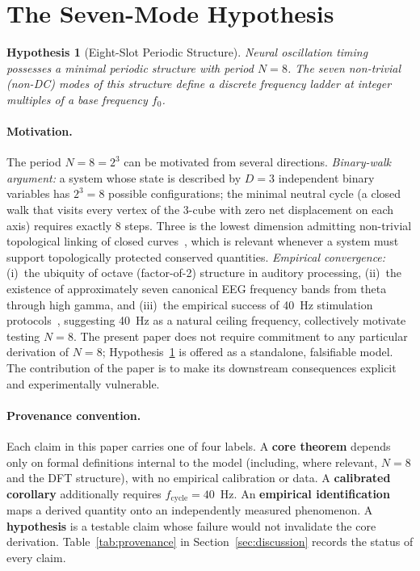 \documentclass[11pt,a4paper]{article}
\newtheorem{hypothesis}{Hypothesis}
\begin{document}
\section{The Seven-Mode Hypothesis}
\label{sec:hypothesis}

\begin{hypothesis}[Eight-Slot Periodic Structure]
\label{hyp:eight}
Neural oscillation timing possesses a minimal periodic structure with
period $N=8$. The seven non-trivial (non-DC) modes of this structure
define a discrete frequency ladder at integer multiples of a base
frequency $f_0$.
\end{hypothesis}

\paragraph{Motivation.}
The period $N = 8 = 2^3$ can be motivated from several directions.
\emph{Binary-walk argument:} a system whose state is described by
$D = 3$ independent binary variables has $2^3 = 8$ possible
configurations; the minimal neutral cycle (a closed walk that visits
every vertex of the 3-cube with zero net displacement on each axis)
requires exactly $8$ steps. Three is the lowest dimension
admitting non-trivial topological linking of closed
curves~\citep{rolfsen1976}, which is relevant whenever a system must
support topologically protected conserved quantities.
\emph{Empirical convergence:} (i)~the ubiquity of octave
(factor-of-2) structure in auditory processing, (ii)~the existence of
approximately seven canonical EEG frequency bands from theta through
high gamma, and (iii)~the empirical success of 40~Hz stimulation
protocols~\citep{iaccarino2016}, suggesting 40~Hz as a natural ceiling
frequency, collectively motivate testing $N = 8$.
The present paper does not require commitment to any particular
derivation of $N = 8$; Hypothesis~\ref{hyp:eight} is offered as a
standalone, falsifiable model. The contribution of the paper is to make
its downstream consequences explicit and experimentally vulnerable.

\paragraph{Provenance convention.}
Each claim in this paper carries one of four labels.
A \textbf{core theorem} depends only on formal definitions internal to
the model (including, where relevant, $N = 8$ and the DFT structure),
with no empirical calibration or data.
A \textbf{calibrated corollary} additionally requires
$f_{\mathrm{cycle}} = 40$~Hz.
An \textbf{empirical identification} maps a derived quantity onto an
independently measured phenomenon.
A \textbf{hypothesis} is a testable claim whose failure would not
invalidate the core derivation.
Table~\ref{tab:provenance} in
Section~\ref{sec:discussion} records the status of every claim.
\end{document}
